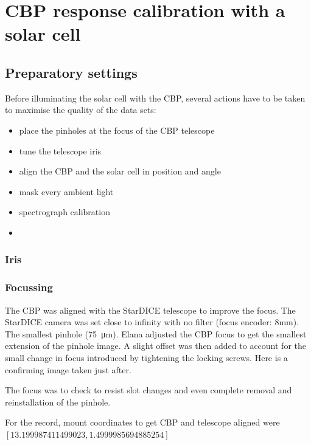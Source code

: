 \section{CBP response calibration with a solar cell}
\label{sec:rcbp}



\subsection{Preparatory settings}

Before illuminating the solar cell with the CBP, several actions have to be taken to maximise the quality of the data sets:
\begin{itemize}
\item place the pinholes at the focus of the CBP telescope
\item tune the telescope iris
\item align the CBP and the solar cell in position and angle
\item mask every ambient light
\item spectrograph calibration
\item {}
\end{itemize}


\subsubsection{Iris}


\subsubsection{Focussing}



The CBP was aligned with the StarDICE telescope to improve the focus. The
StarDICE camera was set close to infinity with no filter (focus encoder:
8mm). The smallest pinhole (\SI{75}{\um}). Elana adjusted the CBP focus to get the smallest extension of the pinhole
image. A slight offset was then added to account for the small change in focus
introduced by tightening the locking screws. Here is a confirming image taken
just after.

The focus was to check to resist slot changes and even complete removal and
reinstallation of the pinhole.

For the record, mount coordinates to get CBP and telescope aligned were
$[13.199987411499023, 1.4999985694885254]$



